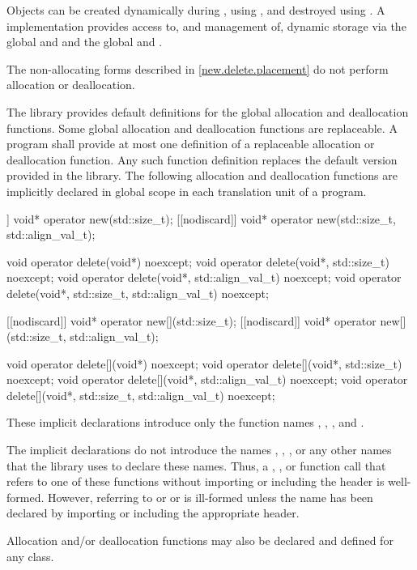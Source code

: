 \pnum
Objects can be created dynamically during , using
%
, and destroyed using
%
. A \Cpp{} implementation
provides access to, and management of, dynamic storage via the global
  and  and the global   and .
\begin{note}
The non-allocating forms described in \ref{new.delete.placement}
do not perform allocation or deallocation.
\end{note}

\pnum
The library provides default definitions for the global allocation and
deallocation functions. Some global allocation and deallocation
functions are replaceable. A \Cpp{} program shall
provide at most one definition of a replaceable allocation or
deallocation function. Any such function definition replaces the default
version provided in the library. The
following allocation and deallocation functions
are implicitly declared in global scope in each translation unit of a
program.

\begin{codeblock}
[[nodiscard]] void* operator new(std::size_t);
[[nodiscard]] void* operator new(std::size_t, std::align_val_t);

void operator delete(void*) noexcept;
void operator delete(void*, std::size_t) noexcept;
void operator delete(void*, std::align_val_t) noexcept;
void operator delete(void*, std::size_t, std::align_val_t) noexcept;

[[nodiscard]] void* operator new[](std::size_t);
[[nodiscard]] void* operator new[](std::size_t, std::align_val_t);

void operator delete[](void*) noexcept;
void operator delete[](void*, std::size_t) noexcept;
void operator delete[](void*, std::align_val_t) noexcept;
void operator delete[](void*, std::size_t, std::align_val_t) noexcept;
\end{codeblock}

These implicit declarations introduce only the function names
 ,  ,
 , and 
.
\begin{note}
The implicit declarations do not introduce
the names ,
,
,
or any other names that the library uses to
declare these names. Thus, a ,
, or function call that refers to one of
these functions without importing or including the header  is
well-formed. However, referring to 
or 
or 
is ill-formed unless the name has been declared
by importing or including the appropriate header.
\end{note}
Allocation and/or
deallocation functions may also be declared and defined for any
class.


